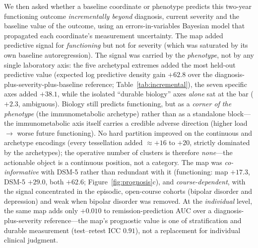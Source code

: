 We then asked whether a baseline coordinate or phenotype predicts this two-year
functioning outcome \emph{incrementally beyond} diagnosis, current severity and the
baseline value of the outcome, using an errors-in-variables Bayesian model that
propagated each coordinate's measurement uncertainty. The
map added predictive signal for \emph{functioning} but not for severity (which was
saturated by its own baseline autoregression). The signal was carried by the
\emph{phenotype}, not by any single laboratory axis: the five archetypal extremes
added the most held-out predictive value (expected log predictive density gain $+62.8$
over the diagnosis-plus-severity-plus-baseline reference; Table~\ref{tab:incremental}),
the seven specific axes added $+38.1$, while the isolated ``durable biology'' axes
\emph{alone} sat at the bar ($+2.3$, ambiguous). Biology still predicts functioning,
but as a \emph{corner of the phenotype} (the immunometabolic archetype) rather than as
a standalone block---the immunometabolic axis itself carries a credible adverse
direction (higher load $\to$ worse future functioning). No hard partition improved on
the continuous and archetype encodings (every tessellation added $\approx+16$ to
$+20$, strictly dominated by the archetypes); the operative number of clusters is
therefore \emph{none}---the actionable object is a continuous position, not a category.
The map was \emph{co-informative} with DSM-5 rather than redundant with it
(functioning: map $+17.3$, DSM-5 $+29.0$, both $+62.6$; Figure~\ref{fig:prognosis}c),
and \emph{course-dependent}, with the signal concentrated in the episodic, open-course
cohorts (bipolar disorder and depression) and weak when bipolar disorder was removed.
At the \emph{individual} level, the same map adds only $+0.010$ to remission-prediction
AUC over a diagnosis-plus-severity reference---the map's prognostic value is one of
stratification and durable measurement (test--retest ICC $0.91$), not a replacement for
individual clinical judgment.

